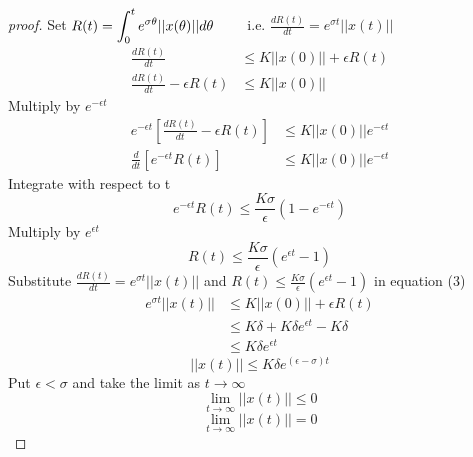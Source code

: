 \documentclass[]{article}
\begin{document}
\begin{proof}[proof]
    Set $\displaystyle R(t) = \int_{0}^{t} e^{\sigma \theta} ||x(\theta)|| d \theta \quad\quad$ i.e. $\displaystyle \frac{dR(t)}{dt} = e^{\sigma t} ||x(t)||$
    \begin{align*}
        \frac{dR(t)}{dt}                  & \leq K ||x(0)|| + \epsilon R(t) \tag{3}
        \\
        \frac{dR(t)}{dt}  - \epsilon R(t) & \leq K ||x(0)||
    \end{align*}
    Multiply by $e^{- \epsilon t}$
    \begin{align*}
        e^{- \epsilon t} \left[\frac{dR(t)}{dt}  - \epsilon R(t)\right] & \leq K ||x(0)|| e^{- \epsilon t}
        \\
        \frac{d}{dt}\left[ e^{- \epsilon t} R(t)\right]                 & \leq K ||x(0)|| e^{- \epsilon t}
    \end{align*}
    Integrate with respect to t
    \[
        e^{- \epsilon t} R(t) \leq \frac{K \sigma}{\epsilon}  (1- e^{- \epsilon t})
    \]
    Multiply by $e^{\epsilon t}$
    \[
        R(t) \leq \frac{K \sigma}{\epsilon}  (e^{\epsilon t} - 1)
    \]
    Substitute $\displaystyle \frac{dR(t)}{dt} = e^{\sigma t} ||x(t)||$ and $\displaystyle R(t) \leq \frac{K \sigma}{\epsilon}  (e^{\epsilon t} - 1)$ in equation (3)
    \begin{align*}
        e^{\sigma t}||x(t)|| & \leq K||x(0)|| + \epsilon R(t)
        \\
                             & \leq K \delta + K \delta e^{\epsilon t} - K \delta
        \\
                             & \leq K \delta e^{\epsilon t}
    \end{align*}
    \[
        ||x(t)|| \leq K \delta e^{(\epsilon-\sigma) t}
    \]
    Put $\epsilon < \sigma$ and take the limit as $t \to \infty$
    \[
        \lim_{t \to \infty} ||x(t)|| \leq 0
    \]
    \[
        \lim_{t \to \infty} ||x(t)|| = 0
    \]
\end{proof}
\end{document}
